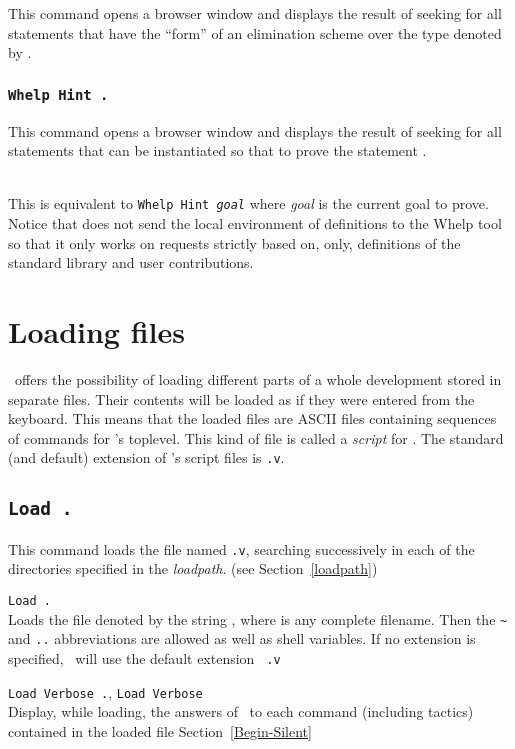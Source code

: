 This command opens a browser window and displays the result of seeking
for all statements that have the ``form'' of an elimination scheme
over the type denoted by {\qualid}.

\subsubsection[\tt Whelp Hint {\term}.]{\tt Whelp Hint {\term}.}

This command opens a browser window and displays the result of seeking
for all statements that can be instantiated so that to prove the
statement {\term}.

\\ This is equivalent to {\tt Whelp Hint
{\sl goal}} where {\sl goal} is the current goal to prove. Notice that
{\Coq} does not send the local environment of definitions to the {\sc
Whelp} tool so that it only works on requests strictly based on, only,
definitions of the standard library and user contributions.

\section{Loading files}

\Coq\ offers the possibility of loading different
parts of a whole development stored in separate files. Their contents
will be loaded as if they were entered from the keyboard. This means
that the loaded files are ASCII files containing sequences of commands
for \Coq's toplevel. This kind of file is called a {\em script} for
\Coq{}. The standard (and default) extension of
\Coq's script files is {\tt .v}.

\subsection[\tt Load {\ident}.]{\tt Load {\ident}.\label{Load}}
This command loads the file named {\ident}{\tt .v}, searching
successively in each of the directories specified in the {\em
  loadpath}. (see Section~\ref{loadpath})

\begin{Variants}
\item {\tt Load {\str}.}\label{Load-str}\\
  Loads the file denoted by the string {\str}, where {\str} is any
  complete filename. Then the \verb.~. and {\tt ..}
  abbreviations are allowed as well as shell variables. If no
  extension is specified, \Coq\ will use the default extension {\tt
    .v}
\item {\tt Load Verbose {\ident}.}, 
  {\tt Load Verbose {\str}}\\
  Display, while loading, the answers of \Coq\ to each command
  (including tactics) contained in the loaded file
  \SeeAlso Section~\ref{Begin-Silent}
\end{Variants}

